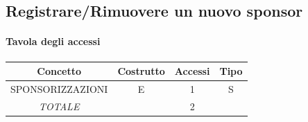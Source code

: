 \documentclass[a4paper,12pt]{report}
\begin{document}
\subsection{Registrare/Rimuovere un nuovo sponsor}
\begin{table}[H]
    \paragraph{Tavola degli accessi\newline}
    \begin{tabular}{|c|c|c|c|}
    \hline
    Concetto          & Costrutto & Accessi & Tipo \\ \hline
    SPONSORIZZAZIONI  & E         & 1       & S    \\ \hline
    \textit{TOTALE}   &           & 2       &      \\ \hline
    \end{tabular}
\end{table}
\end{document}
